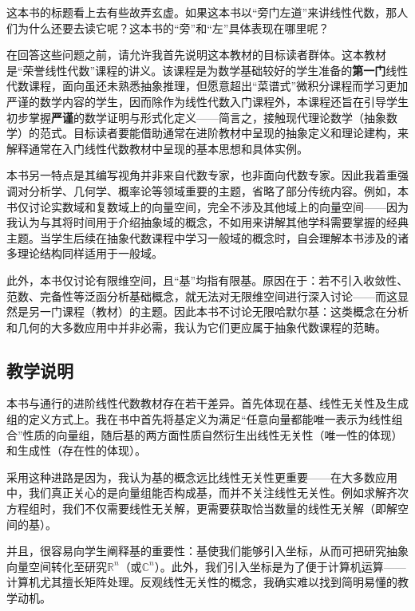 

\begin{preface}

这本书的标题看上去有些故弄玄虚。如果这本书以“旁门左道”来讲线性代数，那人们为什么还要去读它呢？这本书的“旁”和“左”具体表现在哪里呢？

在回答这些问题之前，请允许我首先说明这本教材的目标读者群体。这本教材是“荣誉线性代数”课程的讲义。该课程是为数学基础较好的学生准备的{\bf 第一门}线性代数课程，面向虽还未熟悉抽象推理，但愿意超出“菜谱式”微积分课程而学习更加严谨的数学内容的学生，因而除作为线性代数入门课程外，本课程还旨在引导学生初步掌握{\bf 严谨}的数学证明与形式化定义——简言之，接触现代理论数学（抽象数学）的范式。目标读者要能借助通常在进阶教材中呈现的抽象定义和理论建构，来解释通常在入门线性代数教材中呈现的基本思想和具体实例。

本书另一特点是其编写视角并非来自代数专家，也非面向代数专家。因此我着重强调对分析学、几何学、概率论等领域重要的主题，省略了部分传统内容。例如，本书仅讨论实数域和复数域上的向量空间，完全不涉及其他域上的向量空间——因为我认为与其将时间用于介绍抽象域的概念，不如用来讲解其他学科需要掌握的经典主题。当学生后续在抽象代数课程中学习一般域的概念时，自会理解本书涉及的诸多理论结构同样适用于一般域。

此外，本书仅讨论有限维空间，且“基”均指有限基。原因在于：若不引入收敛性、范数、完备性等泛函分析基础概念，就无法对无限维空间进行深入讨论——而这显然是另一门课程（教材）的主题。因此本书不讨论无限哈默尔基：这类概念在分析和几何的大多数应用中并非必需，我认为它们更应属于抽象代数课程的范畴。

\subsection*{教学说明}

本书与通行的进阶线性代数教材存在若干差异。首先体现在基、线性无关性及生成组的定义方式上。我在书中首先将基定义为满足“任意向量都能唯一表示为线性组合”性质的向量组，随后基的两方面性质自然衍生出线性无关性（唯一性的体现）和生成性（存在性的体现）。

采用这种进路是因为，我认为基的概念远比线性无关性更重要——在大多数应用中，我们真正关心的是向量组能否构成基，而并不关注线性无关性。例如求解齐次方程组时，我们不仅需要线性无关解，更需要获取恰当数量的线性无关解（即解空间的基）。

并且，很容易向学生阐释基的重要性：基使我们能够引入坐标，从而可把研究抽象向量空间转化至研究$\mathbb{R}^n$（或$\mathbb{C}^n$）。此外，我们引入坐标是为了便于计算机运算——计算机尤其擅长矩阵处理。反观线性无关性的概念，我确实难以找到简明易懂的教学动机。


\end{preface}
